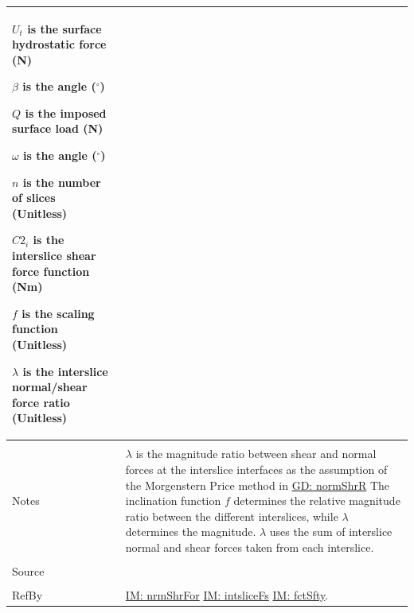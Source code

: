 \documentclass[12pt]{article}
\begin{document}
\begin{minipage}{\textwidth}
\begin{tabular}{p{} p{}}
\begin{symbDescription}
                                                                                           \item{${U_{t}}$ is the surface hydrostatic force (N)}
                                                                                           \item{$β$ is the angle (${}^{\circ}$)}
                                                                                           \item{$Q$ is the imposed surface load (N)}
                                                                                           \item{$ω$ is the angle (${}^{\circ}$)}
                                                                                           \item{$n$ is the number of slices (Unitless)}
                                                                                           \item{${C2_{i}}$ is the interslice shear force function (Nm)}
                                                                                           \item{$f$ is the scaling function (Unitless)}
                                                                                           \item{$λ$ is the interslice normal/shear force ratio (Unitless)}
                                                                                           \end{symbDescription}
                                                                                           \\ \midrule \\
                                                                                           Notes & $λ$ is the magnitude ratio between shear and normal forces at the interslice interfaces as the assumption of the Morgenstern Price method in \hyperref[GD:normShrR]{GD: normShrR} The inclination function $f$ determines the relative magnitude ratio between the different interslices, while $λ$ determines the magnitude. $λ$ uses the sum of interslice normal and shear forces taken from each interslice.
                                                                                                   \\ \midrule \\
                                                                                                   Source & \cite{chen2005}
                                                                                                            \\ \midrule \\
                                                                                                            RefBy & \hyperref[IM:nrmShrFor]{IM: nrmShrFor} \hyperref[IM:intsliceFs]{IM: intsliceFs} \hyperref[IM:fctSfty]{IM: fctSfty}.
\\ \bottomrule \end{tabular}
\end{minipage}\\
\end{document}
